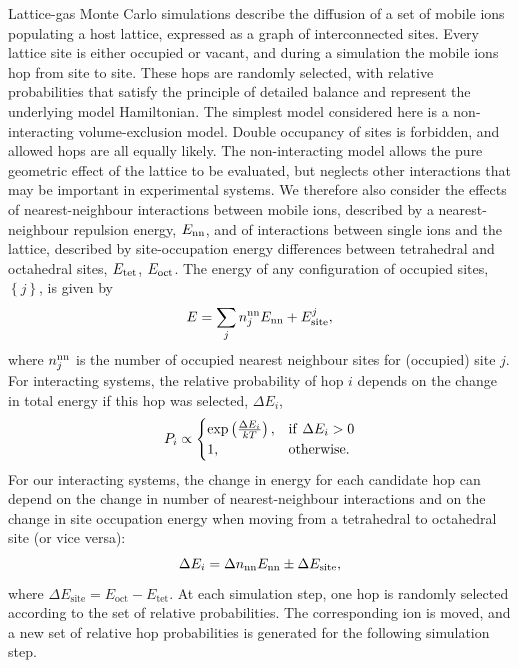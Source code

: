 \documentclass[aps,prb,twocolumn,superscriptaddress,reprint]{revtex4-1}
\newcommand{\set}[1]{\left\{#1\right\}}
\begin{document}
Lattice-gas Monte Carlo simulations describe the diffusion of a set of mobile ions populating a host lattice, expressed as a graph of interconnected sites.\cite{Trudeau_GraphTheoryBook} 
Every lattice site is either occupied or vacant, and during a simulation the mobile ions hop from site to site. 
These hops are randomly selected, with relative probabilities that satisfy the principle of detailed balance and represent the underlying model Hamiltonian. 
The simplest model considered here is a non-interacting volume-exclusion model.\cite{Kutner_PhysLett1981} Double occupancy of sites is forbidden, and allowed hops are all equally likely. 
The non-interacting model allows the pure geometric effect of the lattice to be evaluated, but neglects other interactions that may be important in experimental systems. 
We therefore also consider the effects of nearest-neighbour interactions between mobile ions, described by a nearest-neighbour repulsion energy, $E_{\mathrm{nn}}$, and of interactions between single ions and the lattice, described by site-occupation energy differences between tetrahedral and octahedral sites, $E_{\mathrm{tet}}$, $E_{\mathrm{oct}}$. 
The energy of any configuration of occupied sites, $\set{j}$, is given by
\begin{equation}
  E = \sum_j n_j^{\mathrm{nn}}E_{\mathrm{nn}} + E_{\mathrm{site}}^j,
\end{equation}
where $n^{\mathrm{nn}}_j$ is the number of occupied nearest neighbour sites for (occupied) site $j$. 
For interacting systems, the relative probability of hop $i$ depends on the change in total energy if this hop was selected, $\Delta E_i$,
\begin{equation}
  P_i \propto 
  \begin{cases}
    \mathrm{exp}\left(\frac{\Delta E_i}{kT}\right),& \mathrm{if}\,\,\Delta E_i > 0 \\
    1,                                        & \mathrm{otherwise.}
  \end{cases}
\end{equation}
For our interacting systems, the change in energy for each candidate hop can depend on the change in number of nearest-neighbour interactions and on the change in site occupation energy when moving from a tetrahedral to octahedral site (or vice versa):
\begin{equation}
  \Delta E_i = \Delta n_{\mathrm{nn}}E_{\mathrm{nn}} \pm \Delta E_{\mathrm{site}},
\end{equation}
where $\Delta E_\mathrm{site}=E_\mathrm{oct}-E_\mathrm{tet}$.
At each simulation step, one hop is randomly selected according to the set of relative probabilities. 
The corresponding ion is moved, and a new set of relative hop probabilities is generated for the following simulation step.
\end{document}
